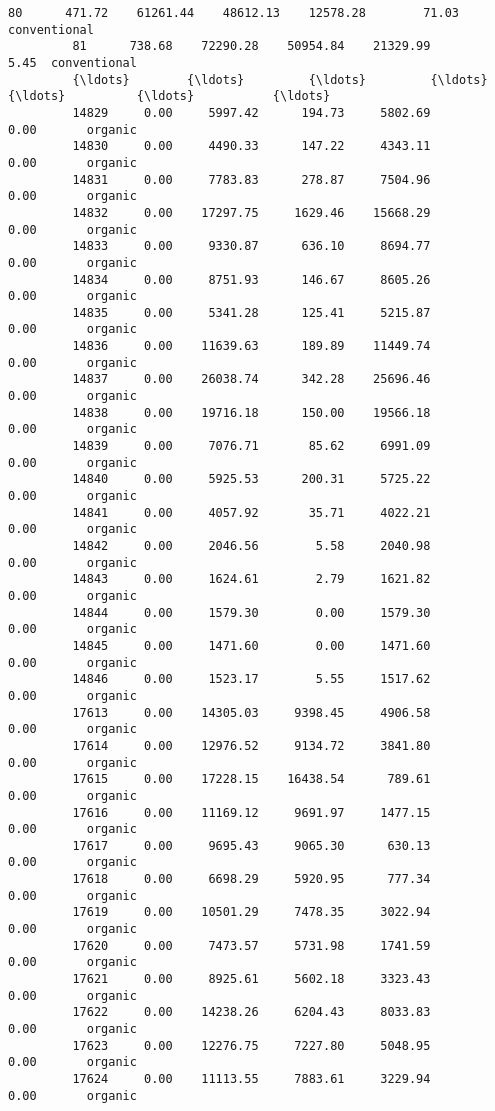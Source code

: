 \documentclass[11pt]{article}
\begin{document}
\begin{Verbatim}[commandchars=\\\{\}]
         80      471.72    61261.44    48612.13    12578.28        71.03  conventional   
         81      738.68    72290.28    50954.84    21329.99         5.45  conventional   
         {\ldots}        {\ldots}         {\ldots}         {\ldots}         {\ldots}          {\ldots}           {\ldots}   
         14829     0.00     5997.42      194.73     5802.69         0.00       organic   
         14830     0.00     4490.33      147.22     4343.11         0.00       organic   
         14831     0.00     7783.83      278.87     7504.96         0.00       organic   
         14832     0.00    17297.75     1629.46    15668.29         0.00       organic   
         14833     0.00     9330.87      636.10     8694.77         0.00       organic   
         14834     0.00     8751.93      146.67     8605.26         0.00       organic   
         14835     0.00     5341.28      125.41     5215.87         0.00       organic   
         14836     0.00    11639.63      189.89    11449.74         0.00       organic   
         14837     0.00    26038.74      342.28    25696.46         0.00       organic   
         14838     0.00    19716.18      150.00    19566.18         0.00       organic   
         14839     0.00     7076.71       85.62     6991.09         0.00       organic   
         14840     0.00     5925.53      200.31     5725.22         0.00       organic   
         14841     0.00     4057.92       35.71     4022.21         0.00       organic   
         14842     0.00     2046.56        5.58     2040.98         0.00       organic   
         14843     0.00     1624.61        2.79     1621.82         0.00       organic   
         14844     0.00     1579.30        0.00     1579.30         0.00       organic   
         14845     0.00     1471.60        0.00     1471.60         0.00       organic   
         14846     0.00     1523.17        5.55     1517.62         0.00       organic   
         17613     0.00    14305.03     9398.45     4906.58         0.00       organic   
         17614     0.00    12976.52     9134.72     3841.80         0.00       organic   
         17615     0.00    17228.15    16438.54      789.61         0.00       organic   
         17616     0.00    11169.12     9691.97     1477.15         0.00       organic   
         17617     0.00     9695.43     9065.30      630.13         0.00       organic   
         17618     0.00     6698.29     5920.95      777.34         0.00       organic   
         17619     0.00    10501.29     7478.35     3022.94         0.00       organic   
         17620     0.00     7473.57     5731.98     1741.59         0.00       organic   
         17621     0.00     8925.61     5602.18     3323.43         0.00       organic   
         17622     0.00    14238.26     6204.43     8033.83         0.00       organic   
         17623     0.00    12276.75     7227.80     5048.95         0.00       organic   
         17624     0.00    11113.55     7883.61     3229.94         0.00       organic   
         

\end{Verbatim}
\end{document}
